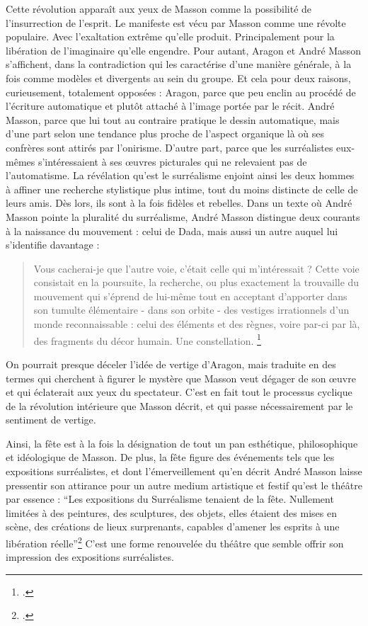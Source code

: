 Cette révolution apparaît aux yeux de Masson comme la possibilité de l’insurrection de l’esprit. Le manifeste est vécu par Masson comme une révolte populaire. Avec l’exaltation extrême qu’elle produit. Principalement pour la libération de l’imaginaire qu’elle engendre. Pour autant, Aragon et André Masson s’affichent, dans la contradiction qui les caractérise d’une manière générale, à la fois comme modèles et divergents au sein du groupe. Et cela pour deux raisons, curieusement, totalement opposées : Aragon, parce que peu enclin au procédé de l’écriture automatique et plutôt attaché à l’image portée par le récit. André Masson, parce que lui tout au contraire pratique le dessin automatique, mais d’une part selon une tendance plus proche de l’aspect organique là où ses confrères sont attirés par l’onirisme. D’autre part, parce que les surréalistes  eux-mêmes s’intéressaient à ses \oe{}uvres picturales qui ne relevaient pas de l’automatisme.  La révélation qu’est le surréalisme enjoint ainsi les deux hommes à affiner une recherche stylistique plus intime, tout du moins distincte de celle de leurs amis. Dès lors, ils sont à la fois fidèles et rebelles. Dans un texte où André Masson pointe la pluralité du surréalisme, André Masson distingue deux courants à la naissance du mouvement : celui de Dada, mais aussi un autre auquel lui s’identifie davantage : 

\begin{quote}
Vous cacherai-je que l’autre voie, c’était celle qui m’intéressait ? Cette voie consistait en la poursuite, la recherche, ou plus exactement la trouvaille du mouvement qui s’éprend de lui-même tout en acceptant d’apporter dans son tumulte élémentaire - dans son orbite - des vestiges irrationnels d’un monde reconnaissable : celui des éléments et des règnes, voire par-ci par là, des fragments du décor humain. Une constellation. 	
\footcite[p34]{rebelle}\end{quote}


	On pourrait presque déceler l’idée de vertige d’Aragon, mais traduite en des termes qui cherchent à figurer le mystère que Masson veut dégager de son \oe{}uvre et qui éclaterait aux yeux du spectateur. C’est en fait tout le processus cyclique de la révolution intérieure que Masson décrit, et qui passe nécessairement par le sentiment de vertige. 

	Ainsi, la fête est à la fois la désignation de tout un pan esthétique, philosophique et idéologique de Masson. De plus, la fête figure des événements tels que les expositions surréalistes, et dont l’émerveillement qu’en décrit André Masson laisse pressentir son attirance pour un autre medium artistique et festif qu’est le théâtre par essence : \enquote{Les expositions du Surréalisme tenaient de la fête. Nullement limitées à des peintures, des sculptures, des objets, elles étaient des mises en scène, des créations de lieux surprenants, capables d’amener les esprits à une libération réelle}\footcite[p41]{memoiremonde} C’est une forme renouvelée du théâtre que semble offrir son impression des expositions surréalistes. 
	
